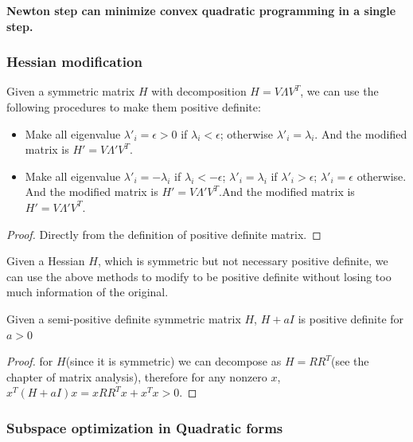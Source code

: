 \begin{refsection}
\begin{remark}\textbf{Newton step can minimize convex quadratic programming in a single step.}
\end{remark}

\subsubsection{Hessian modification}

\begin{lemma}
Given a symmetric matrix $H$ with decomposition $H = V\Lambda V^T$, we can use the following procedures to make them positive definite:
\begin{itemize}
	\item Make all eigenvalue $\lambda'_i = \epsilon > 0$ if $\lambda_i < \epsilon$; otherwise $\lambda'_i = \lambda_i$. And the modified matrix is $H' = V\Lambda' V^T$.
	\item Make all eigenvalue $\lambda'_i = -\lambda_i$ if $\lambda_i < -\epsilon$; $\lambda'_i = \lambda_i$ if $\lambda'_i > \epsilon$; $\lambda'_i = \epsilon$ otherwise. And the modified matrix is $H' = V\Lambda' V^T$.And the modified matrix is $H' = V\Lambda' V^T$.
\end{itemize}
\end{lemma}
\begin{proof}
	Directly from the definition of positive definite matrix.
\end{proof}

\begin{remark}
Given a Hessian $H$, which is symmetric but not necessary positive definite, we can use the above methods to modify to be positive definite without losing too much information of the original.
	
\end{remark}


\begin{lemma}
Given a semi-positive definite symmetric matrix $H$, $H+aI$ is positive definite for $a > 0$
\end{lemma}
\begin{proof}
for $H$(since it is symmetric) we can decompose as $H = RR^T$(see the chapter of matrix analysis), therefore for any nonzero $x$, $x^T(H+aI)x = xRR^Tx + x^Tx > 0$.
\end{proof}


\subsubsection{Subspace optimization in Quadratic forms}


\end{refsection}

